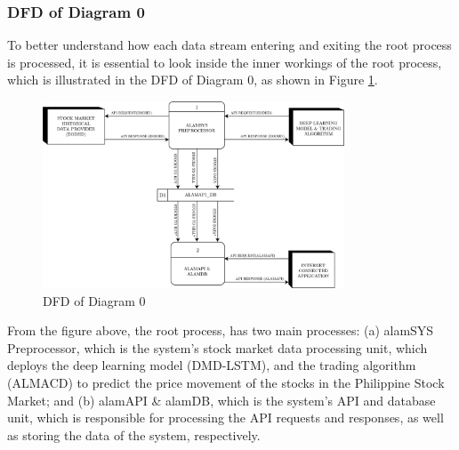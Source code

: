 \subsubsection{DFD of Diagram 0}
\label{subsubsec:dfd0}
To better understand how each data stream entering and exiting the root process is processed, 
it is essential to look inside the inner workings of the root process, which is illustrated in the DFD of Diagram 0, 
as shown in Figure \ref{fig:dfd0}.
\begin{figure}[ht]
    \centering
    \includegraphics[width=0.80\textwidth]{./assets/Chapter_3/DFD/DFD_0.png}
    \caption{DFD of Diagram 0}
    \label{fig:dfd0}
\end{figure}
\FloatBarrier

From the figure above, the root process, has two main processes:
(a) alamSYS Preprocessor, which is the system’s stock market data processing unit, which deploys
the deep learning model (DMD-LSTM), and the trading algorithm (ALMACD) to predict the price movement of the
stocks in the Philippine Stock Market; and
(b) alamAPI \& alamDB, which is the system’s API and database unit, which is responsible for
processing the API requests and responses, as well as storing the data of 
the system, respectively.
\\

